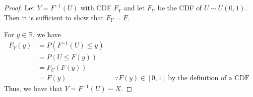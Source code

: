 \documentclass[
  coursecode={MTHE 455},
  assignmentname={Assignment \assignmentnumber},
  studentnumber=20053722,
  name={Bryan Hoang},
]{
  ltxanswer%
}
\begin{document}
\begin{questions}
\begin{parts}
      \part{}
      \begin{solution}
        \begin{proof}
          Let \(Y = F^{-1}(U)\) with CDF \(F_{Y}\) and let \(F_{U}\) be the CDF of \(U \sim U(0,1)\). Then it is sufficient to show that \(F_{Y} = F\).

          For \(y \in \mathbb{R}\), we have
          \begin{align*}
            F_{Y}(y) &= P(F^{-1}(U) \le y)                                                               \\
                     &= P(U \le F(y))                                                                    \\
                     &= F_{U}(F(y))                                                                      \\
                     &= F(y)               & &\because F(y) \in [0,1]\ \text{by the definition of a CDF}
          \end{align*}
          Thus, we have that \(Y = F^{-1}(U) \sim X\).
        \end{proof}
      \end{solution}
    \end{parts}
  \end{questions}
\end{document}
